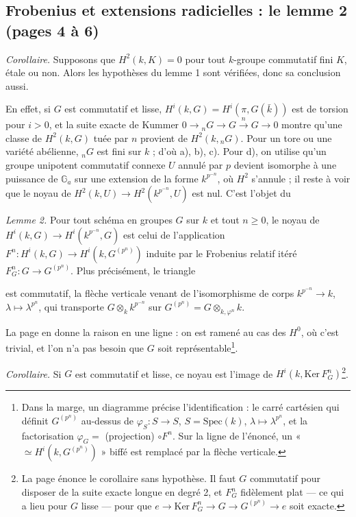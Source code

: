 \documentclass[11pt,a4paper]{article}
\begin{document}
\subsection*{Frobenius et extensions radicielles : le lemme 2 (pages 4 à 6)}

\emph{Corollaire.} Supposons que $H^2(k,K) = 0$ pour tout $k$-groupe commutatif
fini $K$, étale ou non. Alors les hypothèses du lemme 1 sont vérifiées, donc sa
conclusion aussi.

En effet, si $G$ est commutatif et lisse, $H^i(k,G) = H^i(\pi,G(\bar k))$ est
de torsion pour $i > 0$, et la suite exacte de Kummer $0 \to {}_nG \to G
\xrightarrow{n} G \to 0$ montre qu'une classe de $H^2(k,G)$ tuée par $n$ provient
de $H^2(k,{}_nG)$. Pour un tore ou une variété abélienne, ${}_nG$ est fini sur
$k$ ; d'où a), b), c). Pour d), on utilise qu'un groupe unipotent commutatif
connexe $U$ annulé par $p$ devient isomorphe à une puissance de $\mathbb{G}_a$
sur une extension de la forme $k^{p^{-n}}$, où $H^2$ s'annule ; il reste à voir
que le noyau de $H^2(k,U) \to H^2(k^{p^{-n}},U)$ est nul. C'est l'objet du

\emph{Lemme 2.} Pour tout schéma en groupes $G$ sur $k$ et tout $n \geq 0$, le
noyau de $H^i(k,G) \to H^i(k^{p^{-n}},G)$ est celui de l'application
$F^n : H^i(k,G) \to H^i(k,G^{(p^n)})$ induite par le Frobenius relatif itéré
$F^n_G : G \to G^{(p^n)}$. Plus précisément, le triangle


est commutatif, la flèche verticale venant de l'isomorphisme de corps
$k^{p^{-n}} \to k$, $\lambda \mapsto \lambda^{p^n}$, qui transporte
$G \otimes_k k^{p^{-n}}$ sur $G^{(p^n)} = G \otimes_{k,\varphi^n} k$.

La page en donne la raison en une ligne : on est ramené au cas des $H^0$, où
c'est trivial, et l'on n'a pas besoin que $G$ soit représentable\footnote{Dans
la marge, un diagramme précise l'identification : le carré cartésien qui
définit $G^{(p^n)}$ au-dessus de $\varphi_S : S \to S$, $S = \mathrm{Spec}(k)$,
$\lambda \mapsto \lambda^{p^n}$, et la factorisation $\varphi_G = $ (projection)
$\circ F^n$. Sur la ligne de l'énoncé, un « $\simeq H^i(k,G^{(p^n)})$ » biffé est
remplacé par la flèche verticale.}.

\emph{Corollaire.} Si $G$ est commutatif et lisse, ce noyau est l'image de
$H^i(k, \mathrm{Ker}\,F^n_G)$\footnote{La page énonce le corollaire sans
hypothèse. Il faut $G$ commutatif pour disposer de la suite exacte longue en
degré 2, et $F^n_G$ fidèlement plat — ce qui a lieu pour $G$ lisse — pour que
$e \to \mathrm{Ker}\,F^n_G \to G \to G^{(p^n)} \to e$ soit exacte.}.
\end{document}
